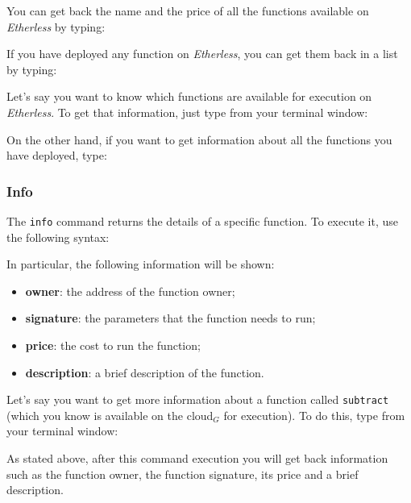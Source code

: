 You can get back the name and the price of all the functions available on \textit{Etherless} by typing:
\begin{center}
\end{center}

If you have deployed any function on \textit{Etherless}, you can get them back in a list by typing:
\begin{center}
\end{center}

Let's say you want to know which functions are available for execution on \textit{Etherless}. To get that information, just type from your terminal window:
\begin{center}
\end{center}
On the other hand, if you want to get information about all the functions you have deployed, type:
\begin{center}
\end{center}

\subsubsection{Info}
The \texttt{info} command returns the details of a specific function. To execute it, use the following syntax: \\
\begin{center}
\end{center}
In particular, the following information will be shown:
\begin{itemize}
	\item \textbf{owner}: the address of the function owner;
	\item \textbf{signature}: the parameters that the function needs to run;
	\item \textbf{price}: the cost to run the function;
	\item \textbf{description}: a brief description of the function.
\end{itemize}
Let's say you want to get more information about a function called \texttt{subtract} (which you know is available on the cloud$_{G}$ for execution). To do this, type from your terminal window:
\begin{center}
\end{center}
As stated above, after this command execution you will get back information such as the function owner, the function signature, its price and a brief description.

